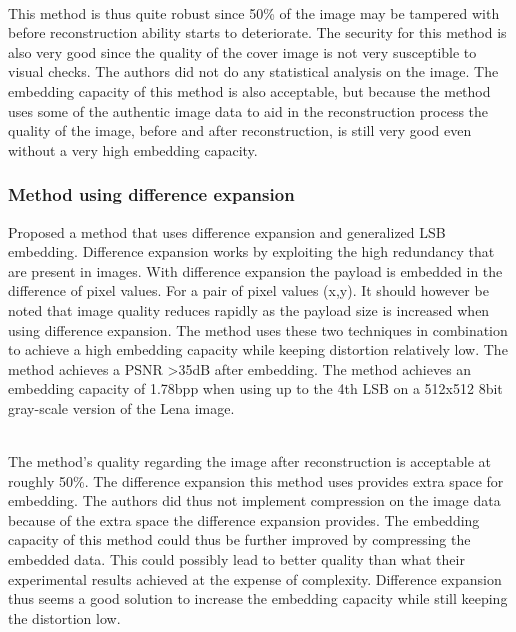 \documentclass[12pt]{article}
\begin{document}
\hspace{0pt} \\
This method \cite {korus2013efficient} is thus quite robust since 50\% of the image may be tampered with before reconstruction ability starts to deteriorate.
The security for this method is also very good since the quality of the cover image is not very susceptible to visual checks.
The authors did not do any statistical analysis on the image.
The embedding capacity of this method is also acceptable, but because the method uses some of the authentic image data to aid in the reconstruction process the quality of the image, before and after reconstruction, is still very good even without a very high embedding capacity.  

\subsubsection{Method using difference expansion}
\label{differenceExpansionOverview}
\cite {tian2003high} Proposed a method that uses difference expansion and generalized LSB embedding.
Difference expansion works by exploiting the high redundancy that are present in images.
With difference expansion the payload is embedded in the difference of pixel values. 
For a pair of pixel values (x,y). \cite {tian2002reversible}
It should however be noted that image quality reduces rapidly as the payload size is increased when using difference expansion. 
The method uses these two techniques in combination to achieve a high embedding capacity while keeping distortion relatively low.
The method achieves a PSNR \textgreater 35dB after embedding.
The method achieves an embedding capacity of 1.78bpp when using up to the 4th LSB on a 512x512 8bit gray-scale version of the Lena image.

\hspace{0pt} \\
The method's \cite {tian2003high} quality regarding the image after reconstruction is acceptable at roughly 50\%. 
The difference expansion this method uses provides extra space for embedding.
The authors did thus not implement compression on the image data because of the extra space the difference expansion provides.
The embedding capacity of this method could thus be further improved by compressing the embedded data. 
This could possibly lead to better quality than what their experimental results achieved at the expense of complexity.
Difference expansion thus seems a good solution to increase the embedding capacity while still keeping the distortion low.
\end{document}
